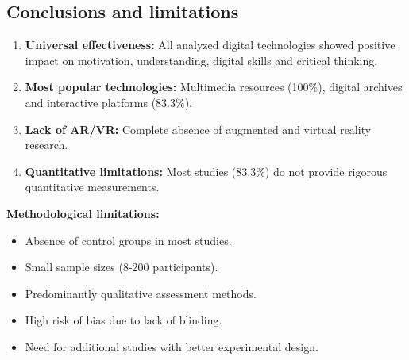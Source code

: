 \documentclass[
hf,
]{ceurart}
\begin{document}
\subsection{Conclusions and limitations}

\begin{enumerate}
    \item \textbf{Universal effectiveness:} All analyzed digital technologies showed positive impact on motivation, understanding, digital skills and critical thinking.
    \item \textbf{Most popular technologies:} Multimedia resources (100\%), digital archives and interactive platforms (83.3\%).
    \item \textbf{Lack of AR/VR:} Complete absence of augmented and virtual reality research.
    \item \textbf{Quantitative limitations:} Most studies (83.3\%) do not provide rigorous quantitative measurements.
\end{enumerate}

\textbf{Methodological limitations:}
\begin{itemize}
    \item Absence of control groups in most studies.
    \item Small sample sizes (8-200 participants).
    \item Predominantly qualitative assessment methods.
    \item High risk of bias due to lack of blinding.
    \item Need for additional studies with better experimental design.
\end{itemize}



\end{document}
